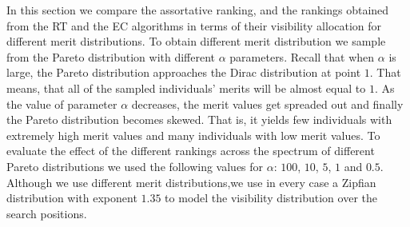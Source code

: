 \documentclass[prodmode,acmec]{acmsmall}
\begin{document}
In this section we compare the assortative ranking, and the rankings
obtained from the RT and the EC algorithms in terms of their
visibility allocation for different merit distributions. To obtain
different merit distribution we sample from the Pareto distribution
with different $\alpha$ parameters. Recall that when $\alpha$ is
large, the Pareto distribution approaches the Dirac distribution at
point $1$. That means, that all of the sampled individuals' merits
will be almost equal to $1$. As the value of parameter $\alpha$
decreases, the merit values get spreaded out and finally the Pareto
distribution becomes skewed. That is, it yields few individuals with
extremely high merit values and many individuals with low merit
values. To evaluate the effect of the different rankings across the
spectrum of different Pareto distributions we used the following
values for $\alpha$: $100$, $10$, $5$, $1$ and $0.5$. Although
we use different merit distributions,we use in every case a Zipfian
distribution with exponent $1.35$ to model the visibility distribution
over the search positions.
\end{document}
